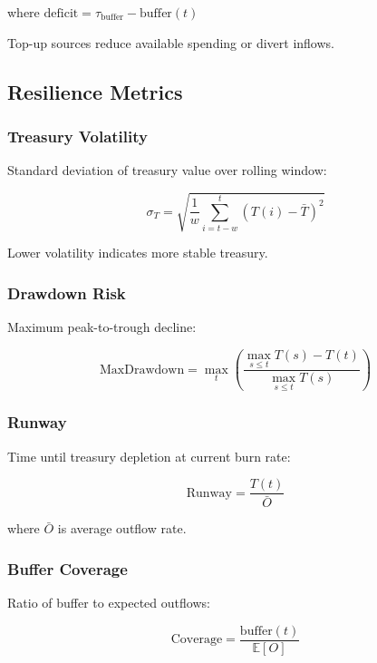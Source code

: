 where $\text{deficit} = \tau_{\text{buffer}} - \text{buffer}(t)$

Top-up sources reduce available spending or divert inflows.

\subsection{Resilience Metrics}

\subsubsection{Treasury Volatility}

Standard deviation of treasury value over rolling window:

\begin{equation}
\sigma_T = \sqrt{\frac{1}{w} \sum_{i=t-w}^{t} (T(i) - \bar{T})^2}
\end{equation}

Lower volatility indicates more stable treasury.

\subsubsection{Drawdown Risk}

Maximum peak-to-trough decline:

\begin{equation}
\text{MaxDrawdown} = \max_{t} \left( \frac{\max_{s \leq t} T(s) - T(t)}{\max_{s \leq t} T(s)} \right)
\end{equation}

\subsubsection{Runway}

Time until treasury depletion at current burn rate:

\begin{equation}
\text{Runway} = \frac{T(t)}{\bar{O}}
\end{equation}

where $\bar{O}$ is average outflow rate.

\subsubsection{Buffer Coverage}

Ratio of buffer to expected outflows:

\begin{equation}
\text{Coverage} = \frac{\text{buffer}(t)}{\mathbb{E}[O]}
\end{equation}


